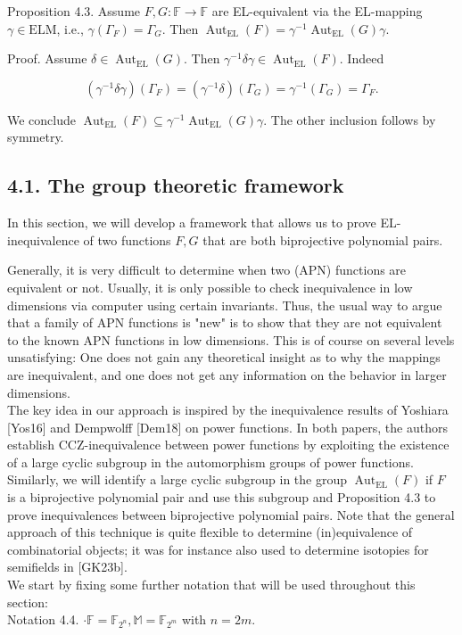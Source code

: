 \documentclass[10pt]{article}
\begin{document}
Proposition 4.3. Assume $F, G: \mathbb{F} \rightarrow \mathbb{F}$ are EL-equivalent via the EL-mapping $\gamma \in \mathrm{ELM}$, i.e., $\gamma\left(\Gamma_{F}\right)=\Gamma_{G}$. Then $\operatorname{Aut}_{\mathrm{EL}}(F)=\gamma^{-1} \operatorname{Aut}_{\mathrm{EL}}(G) \gamma$.

Proof. Assume $\delta \in \operatorname{Aut}_{\mathrm{EL}}(G)$. Then $\gamma^{-1} \delta \gamma \in \operatorname{Aut}_{\mathrm{EL}}(F)$. Indeed

$$
\left(\gamma^{-1} \delta \gamma\right)\left(\Gamma_{F}\right)=\left(\gamma^{-1} \delta\right)\left(\Gamma_{G}\right)=\gamma^{-1}\left(\Gamma_{G}\right)=\Gamma_{F} .
$$

We conclude $\operatorname{Aut}_{\mathrm{EL}}(F) \subseteq \gamma^{-1} \operatorname{Aut}_{\mathrm{EL}}(G) \gamma$. The other inclusion follows by symmetry.

\subsection*{4.1. The group theoretic framework}
In this section, we will develop a framework that allows us to prove EL-inequivalence of two functions $F, G$ that are both biprojective polynomial pairs.

Generally, it is very difficult to determine when two (APN) functions are equivalent or not. Usually, it is only possible to check inequivalence in low dimensions via computer using certain invariants. Thus, the usual way to argue that a family of APN functions is "new" is to show that they are not equivalent to the known APN functions in low dimensions. This is of course on several levels unsatisfying: One does not gain any theoretical insight as to why the mappings are inequivalent, and one does not get any information on the behavior in larger dimensions.\\[0pt]
The key idea in our approach is inspired by the inequivalence results of Yoshiara [Yos16] and Dempwolff [Dem18] on power functions. In both papers, the authors establish CCZ-inequivalence between power functions by exploiting the existence of a large cyclic subgroup in the automorphism groups of power functions. Similarly, we will identify a large cyclic subgroup in the group $\operatorname{Aut}_{\mathrm{EL}}(F)$ if $F$ is a biprojective polynomial pair and use this subgroup and Proposition 4.3 to prove inequivalences between biprojective polynomial pairs. Note that the general approach of this technique is quite flexible to determine (in)equivalence of combinatorial objects; it was for instance also used to determine isotopies for semifields in [GK23b].\\
We start by fixing some further notation that will be used throughout this section:\\
Notation 4.4. $\cdot \mathbb{F}=\mathbb{F}_{2^{n}}, \mathbb{M}=\mathbb{F}_{2^{m}}$ with $n=2 m$.
\end{document}
